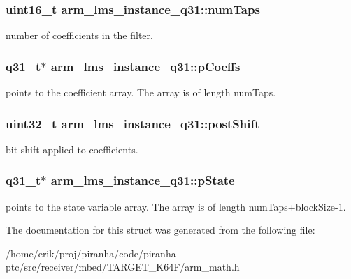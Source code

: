\subsubsection[{\texorpdfstring{num\+Taps}{numTaps}}]{\setlength{\rightskip}{0pt plus 5cm}uint16\+\_\+t arm\+\_\+lms\+\_\+instance\+\_\+q31\+::num\+Taps}\hypertarget{structarm__lms__instance__q31_ac0d84f7d054555931ef8a62511fbcb8a}{}\label{structarm__lms__instance__q31_ac0d84f7d054555931ef8a62511fbcb8a}
number of coefficients in the filter. 
\subsubsection[{\texorpdfstring{p\+Coeffs}{pCoeffs}}]{\setlength{\rightskip}{0pt plus 5cm}q31\+\_\+t$\ast$ arm\+\_\+lms\+\_\+instance\+\_\+q31\+::p\+Coeffs}\hypertarget{structarm__lms__instance__q31_a4afe56e991a5416adfd462aa88bda500}{}\label{structarm__lms__instance__q31_a4afe56e991a5416adfd462aa88bda500}
points to the coefficient array. The array is of length num\+Taps. 
\subsubsection[{\texorpdfstring{post\+Shift}{postShift}}]{\setlength{\rightskip}{0pt plus 5cm}uint32\+\_\+t arm\+\_\+lms\+\_\+instance\+\_\+q31\+::post\+Shift}\hypertarget{structarm__lms__instance__q31_a4705a8f0011bb9166e09bf5bd51e595e}{}\label{structarm__lms__instance__q31_a4705a8f0011bb9166e09bf5bd51e595e}
bit shift applied to coefficients. 
\subsubsection[{\texorpdfstring{p\+State}{pState}}]{\setlength{\rightskip}{0pt plus 5cm}q31\+\_\+t$\ast$ arm\+\_\+lms\+\_\+instance\+\_\+q31\+::p\+State}\hypertarget{structarm__lms__instance__q31_a206d47b49de6f357f933ebe61520753c}{}\label{structarm__lms__instance__q31_a206d47b49de6f357f933ebe61520753c}
points to the state variable array. The array is of length num\+Taps+block\+Size-\/1. 

The documentation for this struct was generated from the following file\+:\begin{DoxyCompactItemize}
\item 
/home/erik/proj/piranha/code/piranha-\/ptc/src/receiver/mbed/\+T\+A\+R\+G\+E\+T\+\_\+\+K64\+F/arm\+\_\+math.\+h\end{DoxyCompactItemize}
